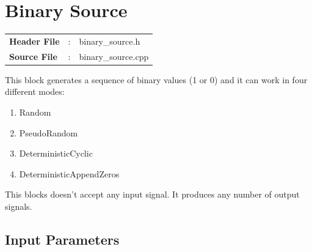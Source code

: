 \clearpage

\section{Binary Source}

\begin{tcolorbox}	
	\begin{tabular}{p{2.75cm} p{0.2cm} p{10.5cm}} 	
		\textbf{Header File}   &:& binary\_source.h \\
		\textbf{Source File}   &:& binary\_source.cpp \\
	\end{tabular}
\end{tcolorbox}

\maketitle
This block generates a sequence of binary values (1 or 0) and it can work in four different modes:

\begin{multicols}{2}
\begin{enumerate}
	\item Random
	\item PseudoRandom
	\item DeterministicCyclic
	\item DeterministicAppendZeros
\end{enumerate}
\end{multicols}

This blocks doesn't accept any input signal. It produces any number of output signals.

\subsection*{Input Parameters}


